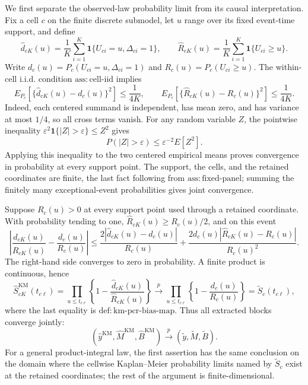 We first separate the observed-law probability limit from its causal interpretation. Fix a cell \(c\) on the finite discrete submodel, let \(u\) range over its fixed event-time support, and define
\[
\widehat d_{cK}(u)=\frac1K\sum_{i=1}^K
 \mathbf 1\{U_{ci}=u,\Delta_{ci}=1\},\qquad
\widehat R_{cK}(u)=\frac1K\sum_{i=1}^K
 \mathbf 1\{U_{ci}\ge u\}.
\]
Write \(d_c(u)=P_c(U_{ci}=u,\Delta_{ci}=1)\) and \(R_c(u)=P_c(U_{ci}\ge u)\). The within-cell i.i.d. condition \(\mathrm{ass{:}cell\mbox{-}iid}\) implies
\[
E_{P_c}\!\left[\{\widehat d_{cK}(u)-d_c(u)\}^2\right]\le\frac1{4K},
\qquad
E_{P_c}\!\left[\{\widehat R_{cK}(u)-R_c(u)\}^2\right]\le\frac1{4K}.
\]
Indeed, each centered summand is independent, has mean zero, and has variance at most \(1/4\), so all cross terms vanish. For any random variable \(Z\), the pointwise inequality \(\varepsilon^2\mathbf 1\{|Z|>\varepsilon\}\le Z^2\) gives
\[
P(|Z|>\varepsilon)\le \varepsilon^{-2}E[Z^2].
\]
Applying this inequality to the two centered empirical means proves convergence in probability at every support point. The support, the cells, and the retained coordinates are finite, the last fact following from \(\mathrm{ass{:}fixed\mbox{-}panel}\); summing the finitely many exceptional-event probabilities gives joint convergence.

Suppose \(R_c(u)>0\) at every support point used through a retained coordinate. With probability tending to one, \(\widehat R_{cK}(u)\ge R_c(u)/2\), and on this event
\[
\left|\frac{\widehat d_{cK}(u)}{\widehat R_{cK}(u)}-
          \frac{d_c(u)}{R_c(u)}\right|
\le
\frac{2|\widehat d_{cK}(u)-d_c(u)|}{R_c(u)}
+\frac{2d_c(u)|\widehat R_{cK}(u)-R_c(u)|}{R_c(u)^2}.
\]
The right-hand side converges to zero in probability. A finite product is continuous, hence
\[
\widehat S^{\mathrm{KM}}_{cK}(t_{c\ell})
=\prod_{u\le t_{c\ell}}
 \left\{1-\frac{\widehat d_{cK}(u)}{\widehat R_{cK}(u)}\right\}
\xrightarrow{p}
\prod_{u\le t_{c\ell}}
 \left\{1-\frac{d_c(u)}{R_c(u)}\right\}
=\widetilde S_c(t_{c\ell}),
\]
where the last equality is \(\mathrm{def{:}km\mbox{-}pcr\mbox{-}bias\mbox{-}map}\). Thus all extracted blocks converge jointly:
\[
(\widehat y^{\mathrm{KM}},\widehat M^{\mathrm{KM}},\widehat B^{\mathrm{KM}})
\xrightarrow{p}(\widetilde y,\widetilde M,\widetilde B).
\]
For a general product-integral law, the first assertion has the same conclusion on the domain where the cellwise Kaplan--Meier probability limits named by \(\widetilde S_c\) exist at the retained coordinates; the rest of the argument is finite-dimensional.

